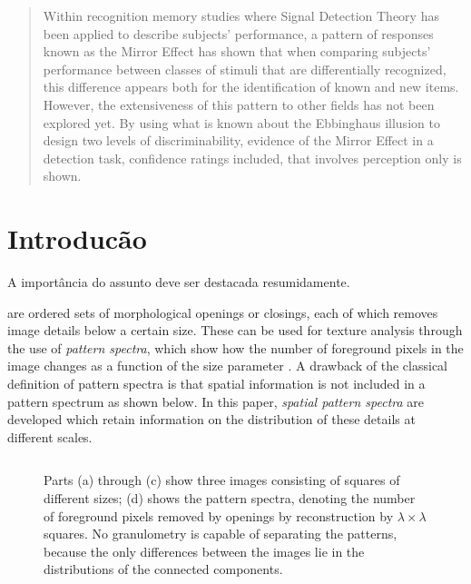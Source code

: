 \documentclass{sciposter}
\begin{document}
\begin{multicols}{3}

\begin{abstract}
Within recognition memory studies where Signal Detection Theory has been applied to describe subjects’ performance, a pattern of responses known as the Mirror Effect has shown that when comparing subjects’ performance between classes of stimuli that are differentially recognized, this difference appears both for the identification of known and new items. However, the extensiveness of this pattern to other fields has not been explored yet. By using what is known about the Ebbinghaus illusion to design two levels of discriminability, evidence of the Mirror Effect in a detection task, confidence ratings included, that involves perception only is shown.
\end{abstract}

\section{Introducão}
A importância do assunto deve ser destacada resumidamente.

 are ordered sets of morphological openings or closings, each of
which removes image details below a certain size. These can be used for texture
analysis
through the use of \emph{pattern spectra}, which show how the number of 
foreground pixels in the image changes as a function of the size parameter 
\cite{maragos89:_patter}.
A drawback of the classical definition of pattern spectra is that spatial 
information is not included in a pattern spectrum as shown below.
 In this paper, \emph{spatial pattern spectra} are developed which retain information on the distribution of these details at different scales.
 

\newcommand{\imsize}{0.45\columnwidth}
\begin{figure}
\begin{center}
\begin{tabular}{c c}

\end{tabular}
\end{center}
\caption{ Parts (a) through (c) show three images consisting of squares of
different sizes;
(d) shows the pattern spectra, denoting the number of foreground pixels 
 removed by openings by reconstruction by $\lambda \times \lambda$ squares. No 
granulometry is capable of separating the patterns, because the only 
differences between the images lie in the distributions of the 
connected components. }\label{fig:blocks}
\end{figure}





\end{multicols}
\end{document}
